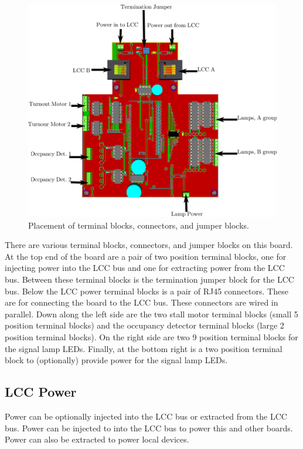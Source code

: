 \begin{figure}[hbpt]\begin{centering}%
\includegraphics[width=5in]{ESP32HalfSidingWiring.png}
\caption{Placement of terminal blocks, connectors, and jumper blocks.}
\end{centering}\end{figure}
There are various terminal blocks, connectors, and jumper blocks on this
board. At the top end of the board are a pair of two position terminal blocks, 
one for injecting power into the LCC bus and one for extracting power from the 
LCC bus.  Between these terminal blocks is the termination jumper block for 
the LCC bus.  Below the LCC  power terminal blocks is a pair of RJ45 
connectors. These are for connecting the board to the LCC bus.  These 
connectors are wired in parallel.  Down along the left side are the two stall 
motor terminal blocks (small 5 position terminal blocks) and the occupancy 
detector terminal blocks (large 2 position terminal blocks).  On the right 
side are two 9 position terminal blocks for the signal lamp LEDs.  Finally, at 
the bottom right is a two position terminal block to (optionally) provide 
power for the signal lamp LEDs.

\subsection{LCC Power}

Power can be optionally injected into the LCC bus or extracted from the LCC 
bus. Power can be injected to into the LCC bus to power this and other boards. 
Power can also be extracted to power local devices.


